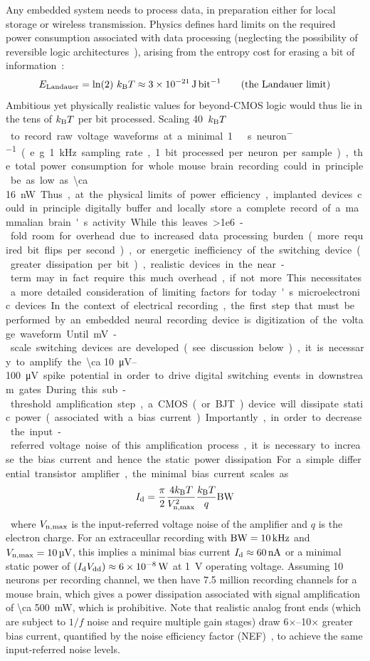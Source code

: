 Any embedded system needs to process data, in preparation either for local storage or wireless transmission.
Physics defines hard limits on the required power consumption associated with data processing (neglecting the possibility of reversible logic architectures~\cite{bennett73}), arising from the entropy cost for erasing a bit of information~\cite{landauer61}:
\[E\sub{Landauer} = \ln(2)\ \kb T\approx \SI{3e-21}{\joule\per\bit} \label{eq:landauer} \tag{the Landauer limit}\]
Ambitious yet physically realistic values for beyond-CMOS logic would thus lie in the tens of $k_{\text{\scriptsize B}} T$ per bit processed.
Scaling \SI{40}{$k_{\text{\scriptsize B}} T$\per\bit} to record raw voltage waveforms at a minimal \SI{1}{\kilo\bit\per\second\per neuron} (e.g. \SI{1}{\kilo\hertz} sampling rate, 1 bit processed per neuron per sample), the total power consumption for whole mouse brain recording could in principle be as low as \SI{\ca 16}{\nano\watt}.
Thus, at the physical limits of power efficiency, implanted devices could in principle digitally buffer and locally store a complete record of a mammalian brain's activity.
While this leaves \num{>1e6}-fold room for overhead due to increased data processing burden (more required bit flips per second), or energetic inefficiency of the switching device (greater dissipation per bit), realistic devices in the near-term may in fact require this much overhead, if not more.
This necessitates a more detailed consideration of limiting factors for today's microelectronic devices.

In the context of electrical recording, the first step that must be performed by an embedded neural recording device is digitization of the voltage waveform.
Until \si{\milli\volt}-scale switching devices are developed (see discussion below), it is necessary to amplify the \SIrange{\ca 10}{100}{\micro\volt} spike potential in order to drive digital switching events in downstream gates.
During this sub-threshold amplification step, a CMOS (or BJT) device will dissipate static power (associated with a bias current). 
Importantly, in order to decrease the input-referred voltage noise of this amplification process, it is necessary to increase the bias current and hence the static power dissipation.
For a simple differential transistor amplifier, the minimal bias current scales as
\[I_{\text{\scriptsize d}} = \frac{\pi}{2} \frac{4k_{\text{\scriptsize B}} T}{V_{\text{\scriptsize n,max}}^2} \frac{k_{\text{\scriptsize B}} T}{q} \text{BW}\]
where $V_{\text{\scriptsize n,max}}$ is the input-referred voltage noise of the amplifier and $q$ is the electron charge.
For an extraceullar recording with $\text{BW} = \SI{10}{\kilo\hertz}$ and $V_{\text{\scriptsize n,max}} = \SI{10}{\micro\volt}$, this implies a minimal bias current $I_{\text{\scriptsize d}}\approx\SI{60}{\nano\ampere}$ or a minimal static power of $\left(I_{\text{\scriptsize d}} V_{\text{\scriptsize dd}}\right)\approx\SI{6e-8}{\watt}$ at \SI{1}{\volt} operating voltage.
Assuming 10 neurons per recording channel, we then have 7.5 million recording channels for a mouse brain, which gives a power dissipation associated with signal amplification of \SI{\ca 500}{\milli\watt}, which is prohibitive.
Note that realistic analog front ends (which are subject to $1/f$ noise and require multiple gain stages) draw 6$\times$--10$\times$ greater bias current, quantified by the noise efficiency factor (NEF)~\cite{steyaert87}, to achieve the same input-referred noise levels.

